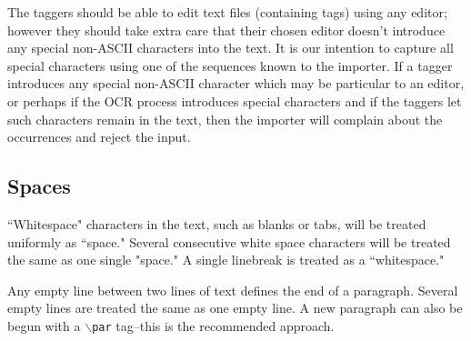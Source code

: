 \documentclass[11pt]{article}
\begin{document}
The taggers should be able to edit text files (containing tags) using
any editor; however they should take extra care that their chosen
editor doesn't introduce any special non-ASCII characters into the
text. It is our intention to capture all special characters using one
of the sequences known to the importer. If a tagger introduces any
special non-ASCII character which may be particular to an editor, or
perhaps if the OCR process introduces special characters and if the
taggers let such characters remain in the text, then the importer will
complain about the occurrences and reject the input.





\subsection{Spaces}

``Whitespace" characters in the text, such as blanks or tabs, will be
treated uniformly as ``space." Several consecutive white space
characters will be treated the same as one single "space." A single
linebreak is treated as a ``whitespace."

Any empty line between two lines of text defines the end of a
paragraph. Several empty lines are treated the same as one empty
line. A new paragraph can also be begun with a {\tt $\backslash$par}
tag--this is the recommended approach.






\end{document}
